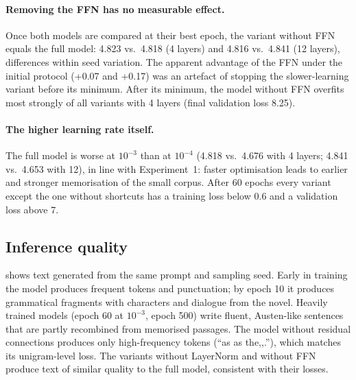 \documentclass[11pt,a4paper]{article}
\begin{document}
\paragraph{Removing the FFN has no measurable effect.} Once both models are compared at their best epoch, the variant without FFN equals the full model: 4.823 vs.\ 4.818 (4 layers) and 4.816 vs.\ 4.841 (12 layers), differences within seed variation. The apparent advantage of the FFN under the initial protocol (+0.07 and +0.17) was an artefact of stopping the slower-learning variant before its minimum. After its minimum, the model without FFN overfits most strongly of all variants with 4 layers (final validation loss 8.25).

\paragraph{The higher learning rate itself.} The full model is worse at $10^{-3}$ than at $10^{-4}$ (4.818 vs.\ 4.676 with 4 layers; 4.841 vs.\ 4.653 with 12), in line with Experiment~1: faster optimisation leads to earlier and stronger memorisation of the small corpus. After 60 epochs every variant except the one without shortcuts has a training loss below 0.6 and a validation loss above 7.

\subsection{Inference quality}

 shows text generated from the same prompt and sampling seed. Early in training the model produces frequent tokens and punctuation; by epoch 10 it produces grammatical fragments with characters and dialogue from the novel. Heavily trained models (epoch 60 at $10^{-3}$, epoch 500) write fluent, Austen-like sentences that are partly recombined from memorised passages. The model without residual connections produces only high-frequency tokens (``as as the,,.''), which matches its unigram-level loss. The variants without LayerNorm and without FFN produce text of similar quality to the full model, consistent with their losses.

\begin{table}[t]
  \centering
  \small
  \caption{Generated continuations of the prompt ``I am sure that''. Samples at epoch 60 come from the end of the revised protocol, not from the best epoch. $\diamond$ marks a partial byte token (half of a curly quotation mark) that cannot be displayed.}
  \label{tab:samples}
  
\end{table}
\end{document}
